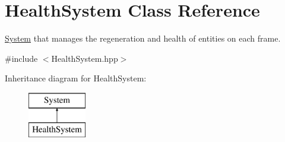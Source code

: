 \hypertarget{class_health_system}{}\section{Health\+System Class Reference}
\label{class_health_system}


\hyperlink{class_system}{System} that manages the regeneration and health of entities on each frame.  




{\ttfamily \#include $<$Health\+System.\+hpp$>$}

Inheritance diagram for Health\+System\+:\begin{figure}[H]
\begin{center}
\leavevmode
\includegraphics[height=2.000000cm]{class_health_system}
\end{center}
\end{figure}

